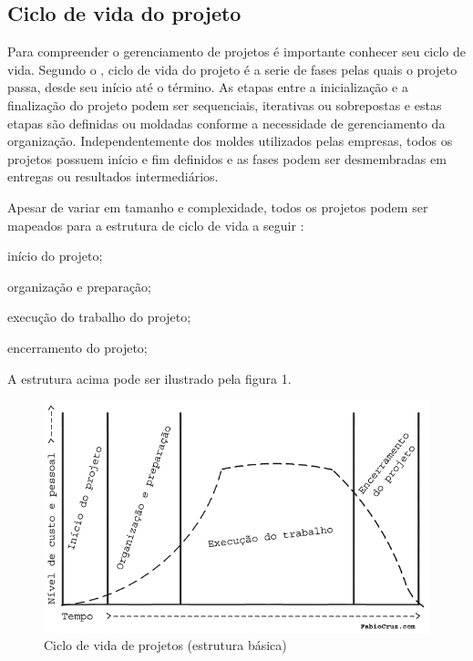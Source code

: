 \documentclass[
    12pt,               %
    openright,          %
    twoside,            %
    a4paper,            %
    chapter=TITLE,     %
    english,            %
    spanish,            %
    portuguese              %
    ]{abntex2}
\begin{document}
\subsection{Ciclo de vida do projeto}
Para compreender o gerenciamento de projetos é importante conhecer seu ciclo de vida. Segundo o , ciclo de vida do projeto é a serie de fases pelas quais o projeto passa, desde seu início até o término. As etapas entre a inicialização e a finalização do projeto podem ser sequenciais, iterativas ou sobrepostas e estas etapas são definidas ou moldadas conforme a necessidade de gerenciamento da organização. Independentemente dos moldes utilizados pelas empresas, todos os projetos possuem início e fim definidos e as fases podem ser desmembradas em entregas ou resultados intermediários.

Apesar de variar em tamanho e complexidade, todos os projetos podem ser mapeados para a estrutura de ciclo de vida a seguir \cite[p.~39]{pmi2013}:

\begin{alineas}
	\item início do projeto;
	\item organização e preparação;
	\item execução do trabalho do projeto;
	\item encerramento do projeto;
\end{alineas}

A estrutura acima pode ser ilustrado pela figura 1.

\begin{figure}[htb]
\RawFloats
	\caption{\label{fig_ciclo_vida_projeto}Ciclo de vida de projetos (estrutura básica)}
	\begin{center}
	    \includegraphics[scale=0.50]{figuras/ciclo_vida_projeto.png}
	\end{center}
\end{figure}
\end{document}
